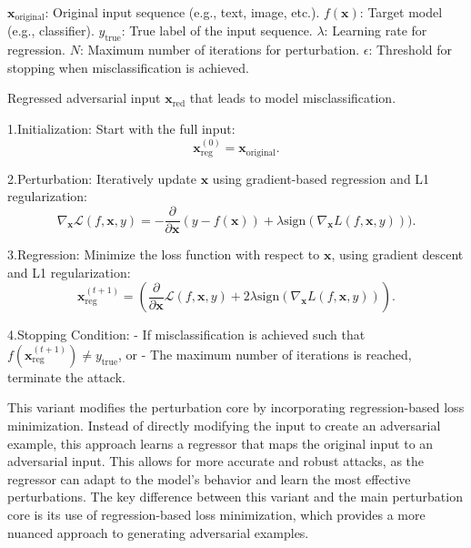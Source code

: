 $\mathbf{x}_{\text{original}}$: Original input sequence (e.g., text, image, etc.).  
$f(\mathbf{x})$: Target model (e.g., classifier).  
$y_{\text{true}}$: True label of the input sequence.  
$\lambda$: Learning rate for regression.  
$N$: Maximum number of iterations for perturbation.  
$\epsilon$: Threshold for stopping when misclassification is achieved.

Regressed adversarial input $\mathbf{x}_{\text{red}}$ that leads to model misclassification.

1.Initialization: 
   Start with the full input:  
   \[
   \mathbf{x}_{\text{reg}}^{(0)} = \mathbf{x}_{\text{original}}.
   \]

2.Perturbation:
   Iteratively update $\mathbf{x}$ using gradient-based regression and L1 regularization:
   \[
   \nabla_\mathbf{x} \mathcal{L}(f, \mathbf{x}, y) = -\frac{\partial}{\partial \mathbf{x}} (y - f(\mathbf{x})) + \lambda \text{sign} (\nabla_\mathbf{x} L(f, \mathbf{x}, y))).
   \]

3.Regression:
   Minimize the loss function with respect to $\mathbf{x}$, using gradient descent and L1 regularization:
   \[
   \mathbf{x}_{\text{reg}}^{(t+1)} = \left(\frac{\partial}{\partial \mathbf{x}} \mathcal{L}(f, \mathbf{x}, y) + 2\lambda \text{sign} (\nabla_\mathbf{x} L(f, \mathbf{x}, y)) \right).
   \]

4.Stopping Condition:
   - If misclassification is achieved such that $f(\mathbf{x}_{\text{reg}}^{(t+1)}) \neq y_{\text{true}}$, or  
   - The maximum number of iterations is reached, terminate the attack.

This variant modifies the perturbation core by incorporating regression-based loss minimization. Instead of directly modifying the input to create an adversarial example, this approach learns a regressor that maps the original input to an adversarial input. This allows for more accurate and robust attacks, as the regressor can adapt to the model's behavior and learn the most effective perturbations. The key difference between this variant and the main perturbation core is its use of regression-based loss minimization, which provides a more nuanced approach to generating adversarial examples.